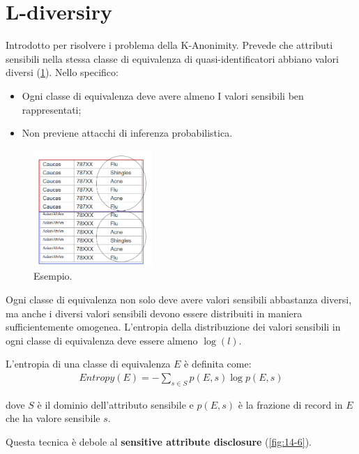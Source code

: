 \section{L-diversiry}
Introdotto per risolvere i problema della K-Anonimity. Prevede che attributi sensibili nella stessa classe di equivalenza di quasi-identificatori abbiano valori diversi (\ref{fig:14-5}). Nello specifico:
\begin{itemize}
    \item Ogni classe di equivalenza deve avere almeno I valori sensibili ben rappresentati;
    \item Non previene attacchi di inferenza probabilistica.
\end{itemize}

\begin{figure}
    \centering
    \includegraphics[width=0.4\textwidth]{images/14-5.png}
    \caption{Esempio.}
    \label{fig:14-5}
\end{figure}

\begin{definition}
    Ogni classe di equivalenza non solo deve avere valori sensibili abbastanza diversi, ma
    anche i diversi valori sensibili devono essere distribuiti in maniera sufficientemente omogenea. L'entropia della distribuzione dei valori sensibili in ogni classe di equivalenza deve essere almeno $\log(l)$.

    \noindent L'entropia di una classe di equivalenza $E$ è definita come:
    \begin{align*}
        Entropy(E) = - \sum_{s \in S} p(E, s) \log{p(E, s)}
    \end{align*}

    \noindent dove $S$ è il dominio dell'attributo sensibile e $p(E, s)$ è la frazione di record in $E$ che ha valore sensibile $s$.
\end{definition}

\noindent Questa tecnica è debole al \textbf{sensitive attribute disclosure} (\ref{fig:14-6}).

